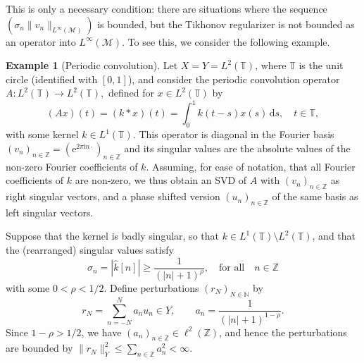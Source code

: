 \documentclass{article}
\theoremstyle{definition}
\newtheorem{example}[theorem]{Example}
\newcommand{\N}{\mathbb{N}}
\newcommand{\Z}{\mathbb{Z}}
\newcommand{\T}{\mathbb{T}}
\newcommand{\di}{\,\mathrm{d}}
\newcommand{\expon}[1]{\mathrm{e}^{#1}}
\newcommand{\imag}{\mathrm{i}}
\newcommand{\smallnorm}[1]{\lVert#1\rVert}
\newcommand{\abs}[1]{\left\lvert#1\right\rvert}
\newcommand{\fhat}[1]{\widehat{#1}}
\begin{document}
This is only a necessary condition: there are situations where the sequence \((\sigma_n\smallnorm{v_n}_{L^\infty(\mathcal{M})})\) is bounded, but the Tikhonov regularizer is not bounded as an operator into \(L^\infty(\mathcal{M})\).
To see this, we consider the following example.
\begin{example}[Periodic convolution]
\label{ex:singularconvolution}
Let \(X=Y=L^2(\T)\), where \(\T\) is the unit circle (identified with \([0,1]\)), and
consider the periodic convolution operator \(A\colon L^2(\T)\to L^2(\T),\)
defined for \(x\in L^2(\T)\) by
\begin{equation*}
    \left(Ax\right)(t) = \left(k*x\right)(t)
    =
    \int_0^1 k(t-s)x(s)\di s,\quad t\in\T,
\end{equation*}
with some kernel \(k\in L^1(\T)\).
This operator is diagonal in the Fourier basis
\(
(v_n)_{n\in\Z}=
(\expon{2\pi\imag n\cdot})_{n\in\Z}\)
and its singular values are the absolute values of the non-zero Fourier coefficients of \(k\).
Assuming, for ease of notation, that all Fourier coefficients of \(k\) are non-zero, we thus obtain an SVD of \(A\) with 
\((v_n)_{n\in\Z}\) as right singular vectors, and a phase shifted version \((u_n)_{n\in\Z}\) of the same basis as left singular vectors.

Suppose that the kernel is badly singular, so that \(k\in L^1(\T)\setminus L^2(\T)\),
and that the (rearranged) singular values satisfy
\begin{equation*}
    \sigma_n=\abs{\fhat{k}[n]}
    \geq \frac{1}{\left(\abs{n}+1\right)^\rho},
    \quad\text{for all}\quad n\in\Z
\end{equation*}
with some \(0<\rho <1/2\).
Define perturbations \((r_N)_{N\in\N}\) by
\begin{equation*}
    r_N = \sum_{n=-N}^N a_n u_n\in Y,
\qquad
    a_n = \frac{1}{\left(\abs{n}+1\right)^{1-\rho}}.
\end{equation*}
Since \(1-\rho>1/2\), we have \((a_n)_{n\in\Z}\in\ell^2(\Z)\), and hence the perturbations are bounded by
\(\smallnorm{r_N}_Y^2 \leq \sum_{n\in \Z} a_n^2 < \infty\).


\end{example}
\end{document}
